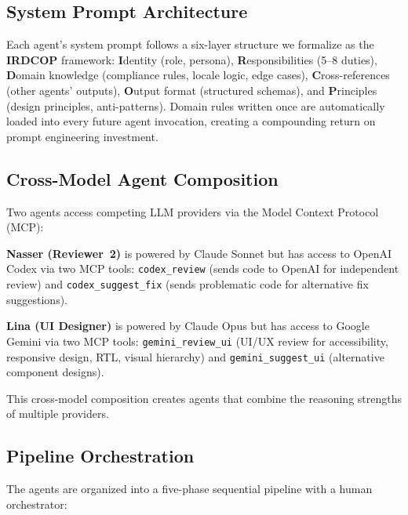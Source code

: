 \documentclass[a4paper,USenglish,cleveref,autoref]{lipics-v2021}
\begin{document}
\subsection{System Prompt Architecture}
\label{sec:promptarch}

Each agent's system prompt follows a six-layer structure we formalize as the \textbf{IRDCOP} framework: \textbf{I}dentity (role, persona), \textbf{R}esponsibilities (5--8 duties), \textbf{D}omain knowledge (compliance rules, locale logic, edge cases), \textbf{C}ross-references (other agents' outputs), \textbf{O}utput format (structured schemas), and \textbf{P}rinciples (design principles, anti-patterns). Domain rules written once are automatically loaded into every future agent invocation, creating a compounding return on prompt engineering investment.

\subsection{Cross-Model Agent Composition}
\label{sec:crossmodel}

Two agents access competing LLM providers via the Model Context Protocol (MCP):

\textbf{Nasser (Reviewer~2)} is powered by Claude Sonnet but has access to OpenAI Codex via two MCP tools: \texttt{codex\_review} (sends code to OpenAI for independent review) and \texttt{codex\_suggest\_fix} (sends problematic code for alternative fix suggestions).

\textbf{Lina (UI Designer)} is powered by Claude Opus but has access to Google Gemini via two MCP tools: \texttt{gemini\_review\_ui} (UI/UX review for accessibility, responsive design, RTL, visual hierarchy) and \texttt{gemini\_suggest\_ui} (alternative component designs).

This cross-model composition creates agents that combine the reasoning strengths of multiple providers.

\subsection{Pipeline Orchestration}
\label{sec:pipeline}

The agents are organized into a five-phase sequential pipeline with a human orchestrator:
\end{document}
